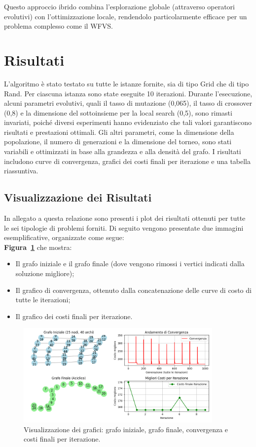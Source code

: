 \documentclass[a4paper,12pt]{article}
\begin{document}
Questo approccio ibrido combina l'esplorazione globale (attraverso operatori evolutivi) con l'ottimizzazione locale, rendendolo particolarmente efficace per un problema complesso come il WFVS.

\newpage
\section{Risultati}
L'algoritmo è stato testato su tutte le istanze fornite, sia di tipo Grid che di tipo Rand. Per ciascuna istanza sono state eseguite 10 iterazioni. Durante l'esecuzione, alcuni parametri evolutivi, quali il tasso di mutazione (0,065), il tasso di crossover (0,8) e la dimensione del sottoinsieme per la local search (0,5), sono rimasti invariati, poiché diversi esperimenti hanno evidenziato che tali valori garantiscono risultati e prestazioni ottimali. Gli altri parametri, come la dimensione della popolazione, il numero di generazioni e la dimensione del torneo, sono stati variabili e ottimizzati in base alla grandezza e alla densità del grafo. I risultati includono curve di convergenza, grafici dei costi finali per iterazione e una tabella riassuntiva.

\subsection{Visualizzazione dei Risultati}
In allegato a questa relazione sono presenti i plot dei risultati ottenuti per tutte le sei tipologie di problemi forniti. Di seguito vengono presentate due immagini esemplificative, organizzate come segue:\\[1ex]
\textbf{Figura~\ref{fig:grafici}} che mostra:
\begin{itemize}
    \item Il grafo iniziale e il grafo finale (dove vengono rimossi i vertici indicati dalla soluzione migliore);
    \item Il grafico di convergenza, ottenuto dalla concatenazione delle curve di costo di tutte le iterazioni;
    \item Il grafico dei costi finali per iterazione.
\end{itemize}

\begin{figure}[H]
    \centering
    \includegraphics[width=0.9\textwidth]{res/graphs_sample.png}
    \caption{Visualizzazione dei grafici: grafo iniziale, grafo finale, convergenza e costi finali per iterazione.}
    \label{fig:grafici}
\end{figure}
\end{document}
